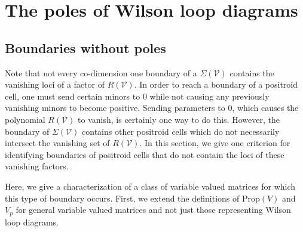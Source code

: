 \documentclass[11pt]{article}
\newcommand{\cV}{\mathcal{V}}
\newcommand{\Prop}{\textrm{Prop}}
\theoremstyle{remark}
\theoremstyle{definition}
\begin{document}
\section{The poles of Wilson loop diagrams \label{sec:poles}}



\subsection{Boundaries without poles \label{sec:boundarysanspoles}}

Note that not every co-dimension one boundary of a $\Sigma(\cV)$ contains the vanishing loci of a factor of $R(\cV)$. In order to reach a boundary of a positroid cell, one must send certain minors to 0 while not causing any previously vanishing minors to become positive. Sending parameters to $0$, which causes the polynomial $R(\cV)$ to vanish, is certainly one way to do this. However, the boundary of $\Sigma(\cV)$ contains other positroid cells which do not necessarily intersect the vanishing set of $R(\cV)$. In this section, we give one criterion for identifying boundaries of positroid cells that do not contain the loci of these vanishing factors. 

Here, we give a characterization of a class of variable valued matrices for which this type of boundary occurs. First, we extend the definitions of $\Prop(V)$ and $V_p$ for general variable valued matrices and not just those representing Wilson loop diagrams.
\end{document}
